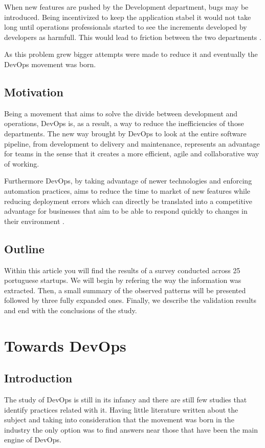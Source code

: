 \documentclass{llncs}
\begin{document}
  When new features are pushed by the Development department, bugs may be introduced. Being incentivized to keep the application stabel it would not take long until operations professionals started to see the increments developed by developers as harmfull. This would lead to friction between the two departments \cite{Bass}.

  As this problem grew bigger attempts were made to reduce it and eventually the DevOps movement was born.

  \subsection{Motivation}

  Being a movement that aims to solve the divide between development and operations, DevOps is, as a result, a way to reduce the inefficiencies of those departments. The new way brought by DevOps to look at the entire software pipeline, from development to delivery and maintenance, represents an advantage for teams in the sense that it creates a more efficient, agile and collaborative way of working.

  Furthermore DevOps, by taking advantage of newer technologies and enforcing automation practices, aims to reduce the time to market of new features while reducing deployment errors \cite{Bass} which can directly be translated into a competitive advantage for businesses that aim to be able to respond quickly to changes in their environment \cite{Wettinger2014}.

  \subsection{Outline}
  Within this article you will find the results of a survey conducted across 25 portuguese startups.
  We will begin by refering the way the information was extracted. Then, a small summary of the observed patterns will be presented followed by three fully expanded ones.
  Finally, we describe the validation results and end with the conclusions of the study.
\section{Towards DevOps}

	\subsection{Introduction}
		The study of DevOps is still in its infancy and there are still few studies that identify practices related with it. Having little literature written about the subject and taking into consideration that the movement was born in the industry the only option was to find answers near those that have been the main engine of DevOps.
\end{document}
